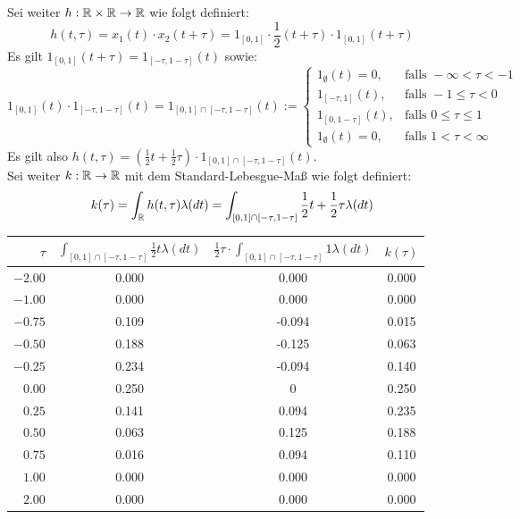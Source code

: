 		Sei weiter $h:{\mathbb R}\times{\mathbb R} \to {\mathbb R}$ wie folgt definiert:
		$$h(t,\tau) = x_1(t)\cdot x_2(t+\tau) = 1_{[0,1]}\cdot\frac{1}{2}(t+\tau)\cdot1_{[0,1]}(t+\tau)$$
		Es gilt $1_{[0,1]}(t+\tau) = 1_{[-\tau,1-\tau]}(t)$ sowie:
		$$1_{[0,1]}(t)\cdot1_{[-\tau,1-\tau]}(t) = 1_{[0,1]\cap[-\tau,1-\tau]}(t) := \begin{cases}
		1_{\emptyset}(t) = 0,	& \text{falls } -\infty < \tau < -1\\
		1_{[-\tau,1]}(t),		& \text{falls } -1 \le \tau < 0\\
		1_{[0,1-\tau]}(t),		& \text{falls } 0 \le \tau \le 1\\
		1_{\emptyset}(t) = 0,	& \text{falls } 1 < \tau < \infty
		\end{cases}$$
		Es gilt also $h(t,\tau) = \left(\frac{1}{2}t +\frac{1}{2}\tau\right) \cdot 1_{[0,1]\cap[-\tau,1-\tau]}(t)$.\\
		Sei weiter $k:{\mathbb R}\to{\mathbb R}$ mit dem Standard-Lebesgue-Maß wie folgt definiert:
		$$k(\tau) = \int_{\mathbb R} h(t,\tau)\lambda(dt)= \int_{[0,1]\cap[-\tau,1-\tau]}\frac{1}{2}t+\frac{1}{2}\tau\lambda(dt)$$
		\begin{tabular}{r | c c | c}
			$\tau$	&	$\int_{[0,1]\cap[-\tau,1-\tau]}\frac{1}{2}t\lambda(dt)$ & $\frac{1}{2}\tau\cdot\int_{[0,1]\cap[-\tau,1-\tau]}1\lambda(dt)$&	$k(\tau)$\\
			\hline
			$-2.00$	&	0.000	&	 0.000	&	 0.000	\\
			$-1.00$	&	0.000	&	 0.000	&	0.000	\\
			$-0.75$	&	0.109	&	-0.094	&	0.015\\
			$-0.50$	&	0.188	&	-0.125	&	0.063\\
			$-0.25$	&	0.234	&	-0.094	&	0.140\\
			$ 0.00$	&	0.250	&	 0		&	0.250\\
			$ 0.25$	&	0.141	&	 0.094	&	0.235\\
			$ 0.50$	&	0.063	&	 0.125	&	0.188\\
			$ 0.75$	&	0.016	&	 0.094	&	0.110\\
			$ 1.00$	&	0.000	&	 0.000	&	0.000\\
			$ 2.00$	&	0.000	&	 0.000	&	 0.000\\
		\end{tabular}\\
